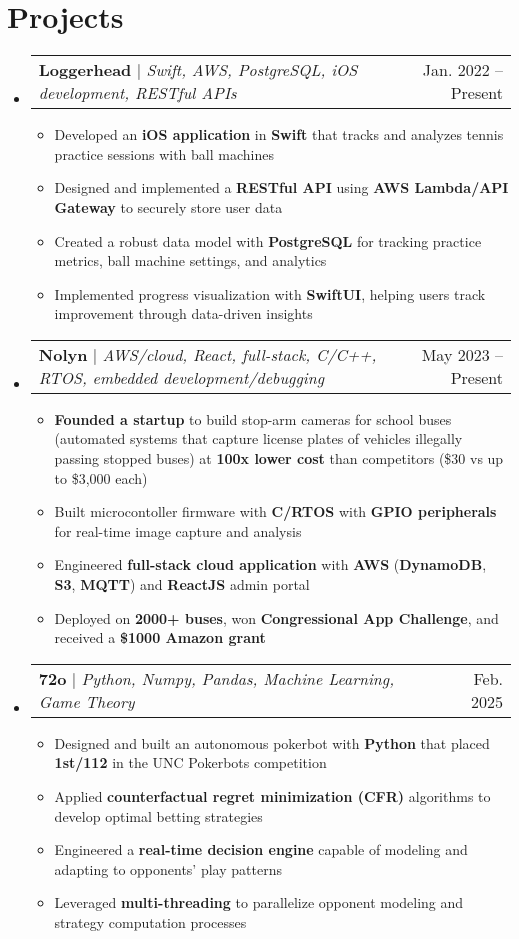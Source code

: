 \documentclass[letterpaper,11pt]{article}
\makeatletter
\newcommand{\resumeItem}[1]{
  \item\small{
    {#1 \vspace{-2pt}}}
}
\newcommand{\resumeProjectHeading}[2]{
    \item
    \begin{tabular*}{0.97\textwidth}{l@{\extracolsep{\fill}}r}
      \small#1 & #2 \\
    \end{tabular*}\vspace{-7pt}
}
\newcommand{\resumeSubHeadingListStart}{\begin{itemize}[leftmargin=0.15in, label={}]}
\newcommand{\resumeSubHeadingListEnd}{\end{itemize}}
\newcommand{\resumeItemListStart}{\begin{itemize}}
\newcommand{\resumeItemListEnd}{\end{itemize}\vspace{-5pt}}
\makeatother
\begin{document}
\section{Projects}
    \resumeSubHeadingListStart
      \resumeProjectHeading
      {\textbf{Loggerhead} $|$ \emph{Swift, AWS, PostgreSQL, iOS development, RESTful APIs}}{Jan. 2022 -- Present}
        \resumeItemListStart
          \resumeItem{Developed an \textbf{iOS application} in \textbf{Swift} that tracks and analyzes tennis practice sessions with ball machines}
          \resumeItem{Designed and implemented a \textbf{RESTful API} using \textbf{AWS Lambda/API Gateway} to securely store user data}
          \resumeItem{Created a robust data model with \textbf{PostgreSQL} for tracking practice metrics, ball machine settings, and analytics}
          \resumeItem{Implemented progress visualization with \textbf{SwiftUI}, helping users track improvement through data-driven insights}
      \resumeItemListEnd
      \resumeProjectHeading
          {\textbf{Nolyn} $|$ \emph{AWS/cloud, React, full-stack, C/C++, RTOS, embedded development/debugging}}{May 2023 -- Present}
          \resumeItemListStart
            \resumeItem{\textbf{Founded a startup} to build stop-arm cameras for school buses (automated systems that capture license plates of vehicles illegally passing stopped buses) at \textbf{100x lower cost} than competitors (\$30 vs up to \$3,000 each)}
            \resumeItem{Built microcontoller firmware with \textbf{C/RTOS} with \textbf{GPIO peripherals} for real-time image capture and analysis}
            \resumeItem{Engineered \textbf{full-stack cloud application} with \textbf{AWS} (\textbf{DynamoDB}, \textbf{S3}, \textbf{MQTT}) and \textbf{ReactJS} admin portal}
            \resumeItem{Deployed on \textbf{2000+ buses}, won \textbf{Congressional App Challenge}, and received a \textbf{\$1000 Amazon grant}}
          \resumeItemListEnd
      \vspace{-4pt}
        \vspace{-4pt}
        \resumeProjectHeading
          {\textbf{72o} $|$ \emph{Python, Numpy, Pandas, Machine Learning, Game Theory}}{Feb. 2025}
          \resumeItemListStart
            \resumeItem{Designed and built an autonomous pokerbot with \textbf{Python} that placed \textbf{1st/112} in the UNC Pokerbots competition}
            \resumeItem{Applied \textbf{counterfactual regret minimization (CFR)} algorithms to develop optimal betting strategies}
            \resumeItem{Engineered a \textbf{real-time decision engine} capable of modeling and adapting to opponents' play patterns}
            \resumeItem{Leveraged \textbf{multi-threading} to parallelize opponent modeling and strategy computation processes}
          \resumeItemListEnd
    \resumeSubHeadingListEnd
\end{document}

